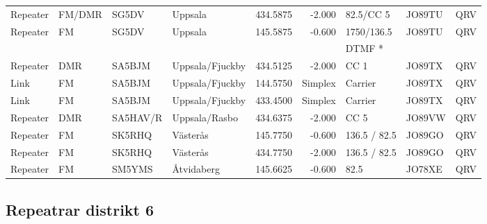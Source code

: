 \begin{landscape}
\begin{longtable}{llllrrlll}
Repeater & FM/DMR     & SG5DV    & Uppsala           & 434.5875     & -2.000     & 82.5/CC 5       & JO89TU      & QRV      \\
Repeater & FM         & SG5DV    & Uppsala           & 145.5875     & -0.600     & 1750/136.5      & JO89TU      & QRV      \\
         &            &          &                   &              &            & DTMF *          &             &          \\
Repeater & DMR        & SA5BJM   & Uppsala/Fjuckby   & 434.5125     & -2.000     & CC 1            & JO89TX      & QRV      \\
Link     & FM         & SA5BJM   & Uppsala/Fjuckby   & 144.5750     & Simplex    & Carrier         & JO89TX      & QRV      \\
Link     & FM         & SA5BJM   & Uppsala/Fjuckby   & 433.4500     & Simplex    & Carrier         & JO89TX      & QRV      \\
Repeater & DMR        & SA5HAV/R & Uppsala/Rasbo     & 434.6375     & -2.000     & CC 5            & JO89VW      & QRV      \\
Repeater & FM         & SK5RHQ   & Västerås          & 145.7750     & -0.600     & 136.5 / 82.5    & JO89GO      & QRV      \\
Repeater & FM         & SK5RHQ   & Västerås          & 434.7750     & -2.000     & 136.5 / 82.5    & JO89GO      & QRV      \\
Repeater & FM         & SM5YMS   & Åtvidaberg        & 145.6625     & -0.600     & 82.5            & JO78XE      & QRV      \\
\end{longtable}


\clearpage

\subsection{Repeatrar distrikt 6}



\end{landscape}
